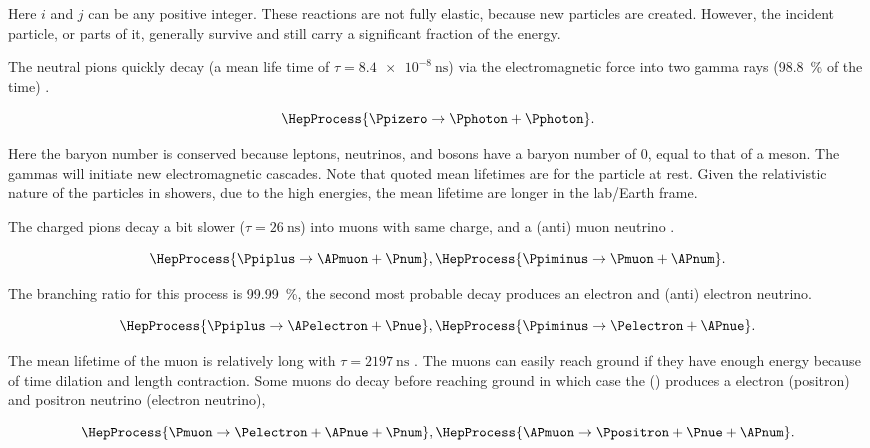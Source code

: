 Here $i$ and $j$ can be any positive integer. These reactions are not fully elastic, because new particles are created. However, the incident particle, or parts of it, generally survive and still carry a significant fraction of the energy.

The neutral pions quickly decay (a mean life time of $\tau = \SI{8.4e-8}{\ns}$) via the electromagnetic force into two gamma rays (\SI{98.8}{\percent} of the time) \cite{olive2014pdg}.

\begin{equation}
\HepProcess{\Ppizero \to \Pphoton + \Pphoton}.
\end{equation}

Here the baryon number is conserved because leptons, neutrinos, and bosons have a baryon number of 0, equal to that of a meson. The gammas will initiate new electromagnetic cascades. Note that quoted mean lifetimes are for the particle at rest. Given the relativistic nature of the particles in showers, due to the high energies, the mean lifetime are longer in the lab/Earth frame.

The charged pions decay a bit slower ($\tau = \SI{26}{\ns}$) into muons with same charge, and a (anti) muon neutrino \cite{olive2014pdg}.

\begin{equation}
\HepProcess{\Ppiplus \to \APmuon + \Pnum},
\HepProcess{\Ppiminus \to \Pmuon + \APnum}.
\end{equation}

The branching ratio for this process is \SI{99.99}{\percent}, the second most probable decay produces an electron and (anti) electron neutrino.

\begin{equation}
\HepProcess{\Ppiplus \to \APelectron + \Pnue},
\HepProcess{\Ppiminus \to \Pelectron + \APnue}.
\end{equation}

The mean lifetime of the muon is relatively long with $\tau = \SI{2197}{\ns}$ \cite{duclos1973muon}. The muons can easily reach ground if they have enough energy because of time dilation and length contraction. Some muons do decay before reaching ground in which case the \Pmuon (\APmuon) produces a electron (positron) and positron neutrino (electron neutrino),

\begin{equation}
\HepProcess{\Pmuon \to \Pelectron + \APnue + \Pnum}, \\
\HepProcess{\APmuon \to \Ppositron + \Pnue + \APnum}.
\end{equation}

